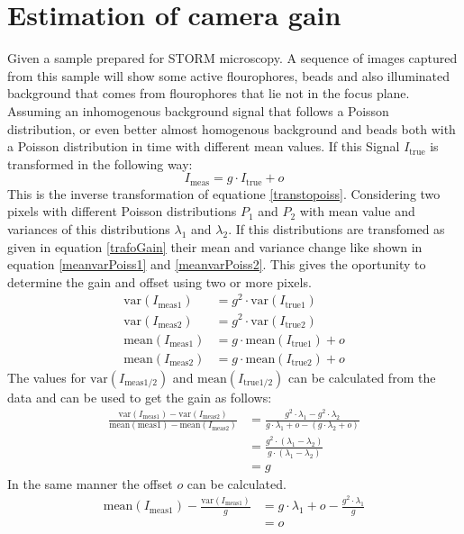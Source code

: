 \section{Estimation of camera gain}
Given a sample prepared for STORM microscopy. A sequence of images captured from this sample will show some active flourophores, beads and also illuminated background that comes from flourophores that lie not in the focus plane. Assuming an inhomogenous background signal that follows a Poisson distribution, or even better almost homogenous background and beads both with a Poisson distribution in time with different mean values. If this Signal $I_\text{true}$ is transformed in the following way:
\begin{equation}
	I_\text{meas} = g \cdot I_\text{true} + o \label{trafoGain}
\end{equation}
This is the inverse transformation of equatione \ref{transtopoiss}.\newline
Considering two pixels with different Poisson distributions $P_1$ and $P_2$ with mean value and variances of this distributions $\lambda_1$ and $\lambda_2$. If this distributions are transfomed as given in equation \ref{trafoGain} their mean and variance change like shown in equation \ref{meanvarPoiss1} and \ref{meanvarPoiss2}. This gives the oportunity to determine the gain and offset using two or more pixels.
\begin{align}
	\text{var}(I_{\text{meas}1})& = g^2\cdot\text{var}(I_{\text{true}1})\\ 
	\text{var}(I_{\text{meas}2})& = g^2\cdot\text{var}(I_{\text{true}2})\\
	\text{mean}(I_{\text{meas}1})& = g\cdot \text{mean}(I_{\text{true}1}) + o\\
	\text{mean}(I_{\text{meas}2})& = g\cdot \text{mean}(I_{\text{true}2}) + o
\end{align}
The values for $\text{var}(I_{\text{meas}1/2})$ and $\text{mean}(I_{\text{true}1/2})$ can be calculated from the data and can be used to get the gain as follows:
\begin{align}
	\frac{\text{var}(I_{\text{meas}1})-\text{var}(I_{\text{meas}2})}{\text{mean}({\text{meas}1})-\text{mean}(I_{\text{meas}2})}&= \frac{g^2\cdot \lambda_1  - g^2\cdot \lambda_2 }{g\cdot \lambda_1 + o - (g\cdot \lambda_2+o)}\\
	& = \frac{g^2\cdot(\lambda_1-\lambda_2)}{g\cdot (\lambda_1-\lambda_2)}\\
	& = g
\end{align}
In the same manner the offset $o$ can be calculated.
\begin{align}
	\text{mean}(I_{\text{meas}1}) - \frac{\text{var}(I_{\text{meas}1})}{g} &= g\cdot \lambda_1 + o - \frac{g^2\cdot\lambda_1}{g}\\
	&= o
\end{align}


